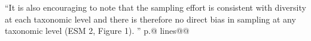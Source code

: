 \documentclass[12pt,letterpaper]{article}
\begin{document}
\begin{enumerate}
``It is also encouraging to note that the sampling effort is consistent with diversity at each taxonomic level and there is therefore no direct bias in sampling at any taxonomic level (ESM 2, Figure 1).
'' p.@ lines@@


\end{enumerate}

\end{document}
